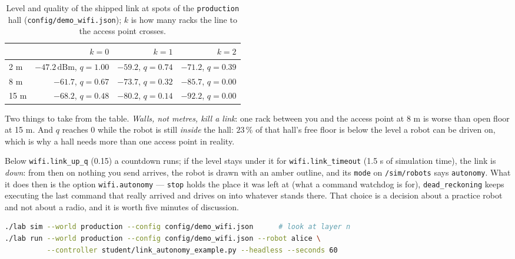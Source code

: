 \documentclass[12pt,a4paper]{scrartcl}
\newcommand{\thema}[1]{\texttt{#1}}
\begin{document}
\begin{table}[ht]\centering\small
\caption{Level and quality of the shipped link at spots of the \thema{production} hall
  (\thema{config/demo\_wifi.json}); \(k\) is how many racks the line to the access point crosses.}
\label{tab:funk}
\begin{tabular}{@{}lrrr@{}}
\toprule
 & \(k=0\) & \(k=1\) & \(k=2\) \\
\midrule
2 m  & \(-47.2\,\mathrm{dBm}\), \(q=1.00\) & \(-59.2\), \(q=0.74\) & \(-71.2\), \(q=0.39\) \\
8 m  & \(-61.7\), \(q=0.67\) & \(-73.7\), \(q=0.32\) & \(-85.7\), \(q=0.00\) \\
15 m & \(-68.2\), \(q=0.48\) & \(-80.2\), \(q=0.14\) & \(-92.2\), \(q=0.00\) \\
\bottomrule
\end{tabular}
\end{table}

Two things to take from the table. \emph{Walls, not metres, kill a link}: one rack between you and the
access point at 8 m is worse than open floor at 15 m. And \(q\) reaches 0 while the robot is still
\emph{inside} the hall: \(23\,\%\) of that hall's free floor is below the level a robot can be driven
on, which is why a hall needs more than one access point in reality.

Below \thema{wifi.link\_up\_q} (0.15) a countdown runs; if the level stays under it for
\thema{wifi.link\_timeout} (1.5 s of simulation time), the link is \emph{down}: from then on nothing you
send arrives, the robot is drawn with an amber outline, and its \thema{mode} on \thema{/sim/robots}
says \thema{autonomy}. What it does then is the option \thema{wifi.autonomy} — \thema{stop} holds the
place it was left at (what a command watchdog is for), \thema{dead\_reckoning} keeps executing the last
command that really arrived and drives on into whatever stands there. That choice is a decision about a
practice robot and not about a radio, and it is worth five minutes of discussion.

\begin{lstlisting}[language=bash]
./lab sim --world production --config config/demo_wifi.json      # look at layer n
./lab run --world production --config config/demo_wifi.json --robot alice \
          --controller student/link_autonomy_example.py --headless --seconds 60
\end{lstlisting}
\end{document}
